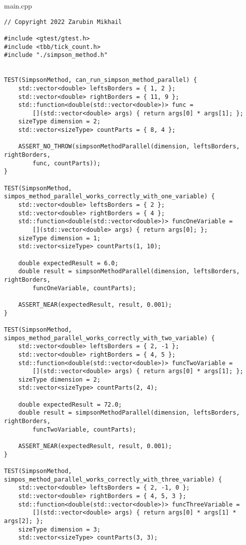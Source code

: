 \documentclass{report}
\begin{document}
main.cpp
\begin{lstlisting}
// Copyright 2022 Zarubin Mikhail

#include <gtest/gtest.h>
#include <tbb/tick_count.h>
#include "./simpson_method.h"


TEST(SimpsonMethod, can_run_simpson_method_parallel) {
    std::vector<double> leftsBorders = { 1, 2 };
    std::vector<double> rightBorders = { 11, 9 };
    std::function<double(std::vector<double>)> func =
        [](std::vector<double> args) { return args[0] * args[1]; };
    sizeType dimension = 2;
    std::vector<sizeType> countParts = { 8, 4 };

    ASSERT_NO_THROW(simpsonMethodParallel(dimension, leftsBorders, rightBorders,
        func, countParts));
}

TEST(SimpsonMethod, simpos_method_parallel_works_correctly_with_one_variable) {
    std::vector<double> leftsBorders = { 2 };
    std::vector<double> rightBorders = { 4 };
    std::function<double(std::vector<double>)> funcOneVariable =
        [](std::vector<double> args) { return args[0]; };
    sizeType dimension = 1;
    std::vector<sizeType> countParts(1, 10);

    double expectedResult = 6.0;
    double result = simpsonMethodParallel(dimension, leftsBorders, rightBorders,
        funcOneVariable, countParts);

    ASSERT_NEAR(expectedResult, result, 0.001);
}

TEST(SimpsonMethod, simpos_method_parallel_works_correctly_with_two_variable) {
    std::vector<double> leftsBorders = { 2, -1 };
    std::vector<double> rightBorders = { 4, 5 };
    std::function<double(std::vector<double>)> funcTwoVariable =
        [](std::vector<double> args) { return args[0] * args[1]; };
    sizeType dimension = 2;
    std::vector<sizeType> countParts(2, 4);

    double expectedResult = 72.0;
    double result = simpsonMethodParallel(dimension, leftsBorders, rightBorders,
        funcTwoVariable, countParts);

    ASSERT_NEAR(expectedResult, result, 0.001);
}

TEST(SimpsonMethod, simpos_method_parallel_works_correctly_with_three_variable) {
    std::vector<double> leftsBorders = { 2, -1, 0 };
    std::vector<double> rightBorders = { 4, 5, 3 };
    std::function<double(std::vector<double>)> funcThreeVariable =
        [](std::vector<double> args) { return args[0] * args[1] * args[2]; };
    sizeType dimension = 3;
    std::vector<sizeType> countParts(3, 3);


\end{lstlisting}
\end{document}
